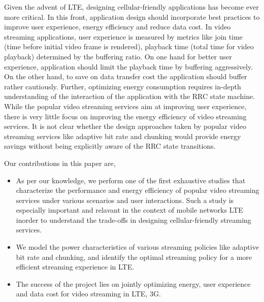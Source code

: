 Given the advent of LTE, designing cellular-friendly applications has become ever more critical. In this front, application design should incorporate best practices to improve user experience, energy efficiency and reduce data cost. In video streaming applications, user experience is measured by metrics like join time (time before initial video frame is rendered), playback time (total time for video playback) determined by the buffering ratio. On one hand for better user experience, application should limit the playback time by buffering aggressively. On the other hand, to save on data transfer cost the application should buffer rather cautiously. Further, optimizing energy consumption requires in-depth understanding of the interaction of the application with the RRC state machine. While the popular video streaming services aim at improving user experience, there is very little focus on improving the energy efficiency of video streaming services. It is not clear whether the design approaches taken by popular video streaming services like adaptive bit rate and chunking would provide energy savings without being explicitly aware of the RRC state transitions.           

Our contributions in this paper are,
\begin{itemize}
\item As per our knowledge, we perform one of the first exhaustive studies that characterize the performance and energy efficiency of popular video streaming services under various scenarios and user interactions.
Such a study is especially important and relavant in the context of mobile networks LTE inorder to understand the trade-offs in designing cellular-friendly streaming services. 
\item We model the power characteristics of various streaming policies like adaptive bit rate and chunking, and identify the optimal streaming policy for a more efficient streaming experience in LTE. 
\item 
The success of the project lies on jointly optimizing energy, user experience and data cost for video streaming in LTE, 3G. 
\end{itemize}
